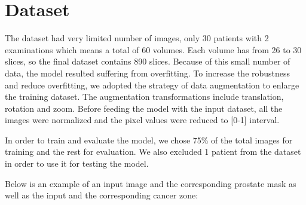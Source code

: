 \documentclass[runningheads,a4paper,11pt]{report}
\begin{document}
\section{Dataset}
\label{section:dataset}
The dataset had very limited number of images, only 30 patients with 2 examinations which means a total of 60 volumes. Each volume has from 26 to 30 slices, so the final dataset contains 890 slices.  Because of this small number of data, the model resulted suffering from overfitting. To increase the
robustness and reduce overfitting, we adopted the strategy of data augmentation to enlarge the training dataset. The augmentation transformations include translation, rotation and
zoom. Before feeding the model with the input dataset, all the images were normalized and the pixel values were reduced to [0-1] interval. \par
In order to train and evaluate the model, we chose 75\% of the total images for training and the rest for evaluation. We also excluded 1 patient from the dataset in order to use it for testing the model.\par
Below is an example of an input image and the corresponding prostate mask as well as the input and the corresponding cancer zone:\par
\end{document}
